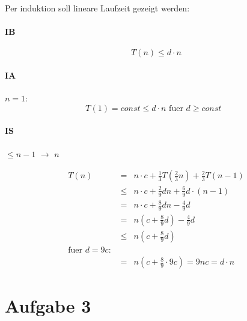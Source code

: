 \begin{enumerate}[(a)]
    Per induktion soll lineare Laufzeit gezeigt werden: 
    
    \paragraph{IB}
    \begin{equation}
    T(n) \leq d \cdot n
    \end{equation}

    \paragraph{IA} $n=1$:
    \begin{equation}
    T(1) = const\leq d \cdot n \text{ fuer $d \geq const$ }
    \end{equation}

    \paragraph{IS} $\leq n-1$ $\to$ $n$

    \begin{eqnarray}
    T(n) &=& n \cdot c + \frac{1}{3} T(\frac{2}{3} n) + \frac{2}{3} T(n-1) \\
         &\leq& n \cdot c + \frac{2}{9} d n + \frac{6}{9} d \cdot (n-1) \\
         &=& n \cdot c + \frac{8}{9} dn - \frac{4}{9} d \\
         &=& n (c + \frac{8}{9} d) - \frac{4}{9} d \\
         &\leq& n (c + \frac{8}{9} d) \\
         \text{fuer $d=9c$: }\\
         &=& n (c + \frac{8}{9} \cdot 9c) = 9 n c = d \cdot n
    \end{eqnarray}
\end{enumerate}

\section*{Aufgabe 3}



